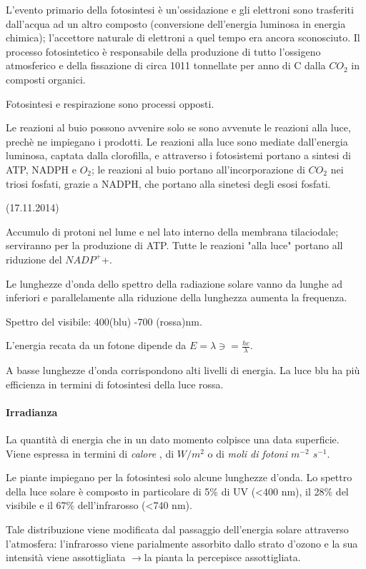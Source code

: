 \documentclass[a4paper,12pt]{book}
\newcommand{\lfreccia}{\ensuremath{\longrightarrow}}
\begin{document}
L’evento primario della fotosintesi è un’ossidazione e gli elettroni sono trasferiti
dall’acqua ad un altro composto (conversione dell’energia luminosa in energia
chimica); l’accettore naturale di elettroni a quel tempo era ancora sconosciuto.
Il processo fotosintetico è responsabile della produzione di tutto
l’ossigeno atmosferico e della fissazione di circa 1011 tonnellate per
anno di C dalla $CO_{2}$ in composti organici.

Fotosintesi e respirazione sono processi opposti.

Le reazioni al buio possono avvenire solo se sono avvenute le reazioni alla luce, prechè ne impiegano i prodotti. 
Le reazioni alla luce sono mediate dall'energia luminosa, captata dalla clorofilla, e attraverso i fotosistemi portano a sintesi di ATP, NADPH e $O_{2}$; le reazioni al buio portano all'incorporazione di $CO_{2}$ nei triosi fosfati, grazie a NADPH, che portano alla sinetesi degli esosi fosfati.

(17.11.2014)

Accumulo di protoni nel lume e nel lato interno della membrana tilaciodale; serviranno per la produzione di ATP.
Tutte le reazioni "alla luce" portano all riduzione del $NADP^{+}$+.

Le lunghezze d'onda dello spettro della radiazione solare vanno da lunghe ad inferiori e parallelamente alla riduzione della lunghezza aumenta la frequenza.

Spettro del visibile: 400(blu) -700 (rossa)nm.

L’energia recata da un fotone dipende da  $E=\lambda \ni = \frac{h c}{\lambda}$.

A basse lunghezze d’onda corrispondono alti livelli di energia. La luce blu ha più efficienza in termini di fotosintesi della luce rossa.

\paragraph{Irradianza}

La quantità di energia che in un dato momento colpisce una data superficie. Viene espressa in termini di \emph{calore} , di \emph{$W/m^{2}$} o di \emph{moli di fotoni $m^{-2}$ $s^{-1}$}.

Le piante impiegano per la fotosintesi solo alcune lunghezze d’onda. Lo spettro della luce solare è composto  in particolare di 5\% di UV (<400 nm), il 28\% del visibile e il 67\% dell’infrarosso (<740 nm).

Tale distribuzione viene modificata dal passaggio dell’energia solare attraverso l’atmosfera: l’infrarosso viene parialmente assorbito dallo strato d’ozono e la sua intensità viene assottigliata \lfreccia la pianta la percepisce assottigliata.
\end{document}
